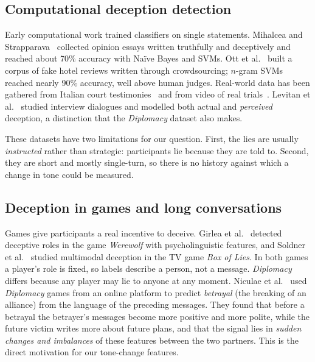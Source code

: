 \documentclass[conference]{IEEEtran}
\begin{document}
\subsection{Computational deception detection}
Early computational work trained classifiers on single statements. Mihalcea and Strapparava~\cite{mihalcea2009lie} collected opinion essays written truthfully and deceptively and reached about 70\% accuracy with Na\"ive Bayes and SVMs. Ott et al.~\cite{ott2011finding} built a corpus of fake hotel reviews written through crowdsourcing; $n$-gram SVMs reached nearly 90\% accuracy, well above human judges. Real-world data has been gathered from Italian court testimonies~\cite{fornaciari2013court} and from video of real trials~\cite{perezrosas2015reallife}. Levitan et al.~\cite{levitan2018interview} studied interview dialogues and modelled both actual and \emph{perceived} deception, a distinction that the \textit{Diplomacy} dataset also makes.

These datasets have two limitations for our question. First, the lies are usually \emph{instructed} rather than strategic: participants lie because they are told to. Second, they are short and mostly single-turn, so there is no history against which a change in tone could be measured.

\subsection{Deception in games and long conversations}
Games give participants a real incentive to deceive. Girlea et al.~\cite{girlea2016werewolf} detected deceptive roles in the game \textit{Werewolf} with psycholinguistic features, and Soldner et al.~\cite{soldner2019boxoflies} studied multimodal deception in the TV game \textit{Box of Lies}. In both games a player's role is fixed, so labels describe a person, not a message. \textit{Diplomacy} differs because any player may lie to anyone at any moment. Niculae et al.~\cite{niculae2015harbingers} used \textit{Diplomacy} games from an online platform to predict \emph{betrayal} (the breaking of an alliance) from the language of the preceding messages. They found that before a betrayal the betrayer's messages become more positive and more polite, while the future victim writes more about future plans, and that the signal lies in \emph{sudden changes and imbalances} of these features between the two partners. This is the direct motivation for our tone-change features.
\end{document}

